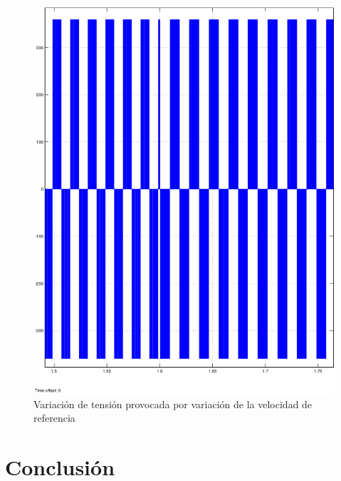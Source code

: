 \documentclass[11pt, a4paper]{article}
\begin{document}
\begin{figure}[H]
\centering
\includegraphics[scale=0.5]{imagenes/zoomtension}
\caption{Variación de tensión provocada por variación de la velocidad de referencia}
\label{zoomte}
\end{figure}


\newpage

\section{Conclusión} 
\end{document}
